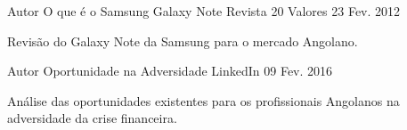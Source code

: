 


\begin{cventries}


\cventry
{Autor} %
{O que é o Samsung Galaxy Note} %
{Revista 20 Valores} %
{23 Fev. 2012} %
{ %
\begin{cvitems}
\item {Revisão do Galaxy Note da Samsung para o mercado Angolano.}
\end{cvitems}
}


\cventry
{Autor} %
{Oportunidade na Adversidade} %
{LinkedIn} %
{09 Fev. 2016} %
{ %
\begin{cvitems}
\item {Análise das oportunidades existentes para os profissionais Angolanos na adversidade da crise financeira.}
\end{cvitems}
}


\end{cventries}
